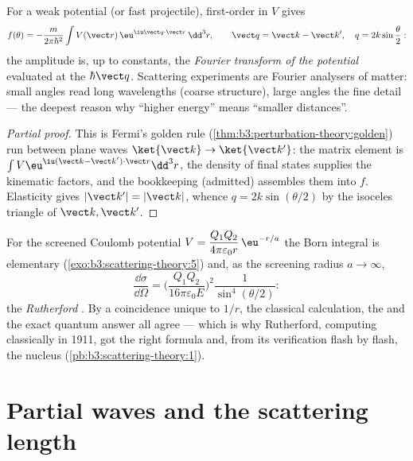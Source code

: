 \begin{theorem}\label{thm:b3:scattering-theory:born}
For a weak potential (or fast projectile), first-order  in $V$ gives
\[
f(\theta) = -\frac{m}{2\pi\hbar^2}
\int V(\vect r)\,\eu^{\iu\vect q\cdot\vect r}\,\dd^3r ,
\qquad
\vect q = \vect k - \vect k' , \quad
q = 2k\sin\frac\theta2 :
\]
the amplitude is, up to constants, the \emph{Fourier transform of
the potential} evaluated at the  $\hbar\vect q$.
Scattering experiments are Fourier analysers of matter: small
angles read long wavelengths (coarse structure), large angles the
fine detail --- the deepest reason why ``higher energy'' means
``smaller distances''.
\end{theorem}

\begin{proof}[Partial proof]
This is Fermi's golden rule
(\cref{thm:b3:perturbation-theory:golden}) run between plane waves
$\ket{\vect k} \to \ket{\vect k'}$: the matrix element is
$\int V\eu^{\iu(\vect k - \vect k')\cdot\vect r}\dd^3r$, the
density of final states supplies the kinematic factors, and the
bookkeeping (admitted) assembles them into $f$. Elasticity gives
$|\vect k'| = |\vect k|$, whence $q = 2k\sin(\theta/2)$ by the
isoceles triangle of $\vect k, \vect k'$.
\end{proof}

\begin{example}\label{ex:b3:scattering-theory:rutherford}
For the screened Coulomb potential $V = \dfrac{Q_1Q_2}{4\pi
\varepsilon_0 r}\,\eu^{-r/a}$ the Born integral is elementary
(\cref{exo:b3:scattering-theory:5}) and, as the screening radius
$a \to \infty$,
\[
\frac{\dd\sigma}{\dd\Omega} =
\Big(\frac{Q_1Q_2}{16\pi\varepsilon_0 E}\Big)^2
\frac{1}{\sin^4(\theta/2)} :
\]
the \emph{Rutherford }. By a coincidence unique to
$1/r$, the classical calculation, the  and the
exact quantum answer all agree --- which is why Rutherford,
computing classically in 1911, got the right formula and, from its
verification flash by flash, the nucleus
(\cref{pb:b3:scattering-theory:1}).
\end{example}

\section{Partial waves and the scattering length}


